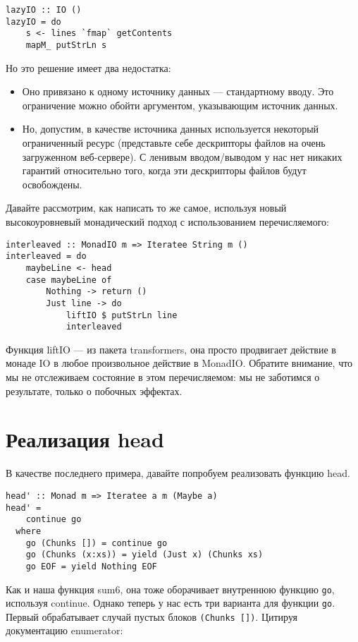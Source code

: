 \begin{lstlisting}
lazyIO :: IO ()
lazyIO = do
    s <- lines `fmap` getContents
    mapM_ putStrLn s
\end{lstlisting}

Но это решение имеет два недостатка:

\begin{itemize}
\item Оно привязано к одному источнику данных --- стандартному вводу. Это ограничение можно обойти аргументом, указывающим источник данных.
\item Но, допустим, в качестве источника данных используется некоторый ограниченный ресурс (представьте себе дескрипторы файлов на очень загруженном веб-сервере). С ленивым вводом/выводом у нас нет никаких гарантий относительно того, когда эти дескрипторы файлов будут освобождены.
\end{itemize}

Давайте рассмотрим, как написать то же самое, используя новый высокоуровневый монадический подход с использованием перечисляемого:

\begin{lstlisting}
interleaved :: MonadIO m => Iteratee String m ()
interleaved = do
    maybeLine <- head
    case maybeLine of
        Nothing -> return ()
        Just line -> do
            liftIO $ putStrLn line
            interleaved
\end{lstlisting}%

Функция liftIO --- из пакета transformers, она просто продвигает действие в монаде IO в любое произвольное действие в MonadIO. Обратите внимание, что мы не отслеживаем состояние в этом перечисляемом: мы не заботимся о результате, только о побочных эффектах.

\section{Реализация head}

В качестве последнего примера, давайте попробуем реализовать функцию head.

\begin{lstlisting}
head' :: Monad m => Iteratee a m (Maybe a)
head' =
    continue go
  where
    go (Chunks []) = continue go
    go (Chunks (x:xs)) = yield (Just x) (Chunks xs)
    go EOF = yield Nothing EOF
\end{lstlisting}

Как и наша функция sum6, она тоже оборачивает внутреннюю функцию \lstinline'go', используя continue. Однако теперь у нас есть три варианта для функции \lstinline'go'. Первый обрабатывает случай пустых блоков \lstinline'(Chunks [])'. Цитируя документацию enumerator:

